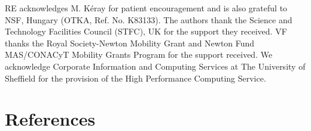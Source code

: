 \documentclass[authoryear,final,1p]{elsarticle}
\begin{document}
\begin{acknowledgements}
RE acknowledges M. K\'eray for patient encouragement and is also grateful to NSF, Hungary (OTKA, Ref. No. K83133). 
The authors thank the Science and Technology Facilities Council (STFC), UK for the support they received. 
VF thanks the Royal Society-Newton Mobility Grant and Newton Fund MAS/CONACyT Mobility
Grants Program for the support received. We acknowledge Corporate Information and Computing 
Services at The University of Sheffield for the provision of the High Performance Computing Service.
\end{acknowledgements}


\section{References}
%

%
%

\end{document}
